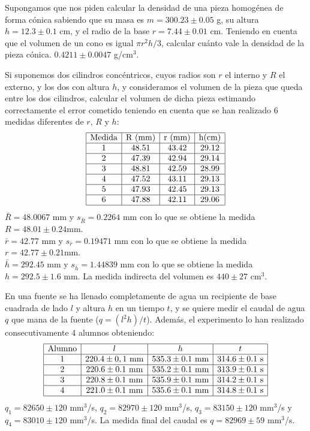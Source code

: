 {Supongamos que nos piden calcular la densidad de una pieza homogénea de forma cónica sabiendo que su masa es $m=
300.23\pm 0.05$ g, su altura $h=12.3 \pm 0.1$ cm, y el radio de la base $r=7.44 \pm 0.01$ cm. Teniendo en cuenta que el
volumen de un cono es igual $\pi r^2 h/3$, calcular cuánto vale la densidad de la pieza cónica.
}
{$0.4211\pm0.0047$ g/cm$^3$.
}
{}


{Si suponemos dos cilindros concéntricos, cuyos radios son $r$ el interno y $R$ el externo, y los dos con altura $h$, y
consideramos el volumen de la pieza que queda entre los dos cilindros, calcular el volumen de dicha pieza estimando
correctamente el error cometido teniendo en cuenta que se han realizado 6 medidas diferentes de $r$, $R$ y $h$:
\[
\begin{array}{|c|c|c|c|}
\hline
\mbox{Medida} & \mbox{R (mm)} & \mbox{r (mm)} & \mbox{h(cm)} \\
\hline
1 & 48.51 & 43.42 & 29.12 \\
\hline
2 & 47.39 & 42.94 & 29.14 \\
\hline
3 & 48.81 & 42.59 & 28.99 \\
\hline
4 & 47.52 & 43.11 & 29.13 \\
\hline
5 & 47.93 & 42.45 & 29.13 \\
\hline
6 & 47.88 & 42.11 & 29.06 \\
\hline
\end{array}
\]
}
{$\bar R=48.0067$ mm y $s_{\bar R}=0.2264$ mm con lo que se obtiene la medida $R=48.01\pm 0.24$mm.\\
$\bar r = 42.77$ mm y $s_{\bar r}=0.19471$ mm con lo que se obtiene la medida $r=42.77\pm 0.21$mm.\\
$\bar h= 292.45$ mm y $s_{\bar h}=1.44839$ mm con lo que se obtiene la medida $h=292.5\pm 1.6$ mm.
La medida indirecta del volumen es $440\pm 27$ cm$^3$. 
}
{}


{En una fuente se ha llenado completamente de agua un recipiente de base cuadrada de lado $l$ y altura $h$ en un tiempo
$t$, y se quiere medir el caudal de agua $q$ que mana de la fuente ($q=(l^2h)/t$). Además, el experimento lo han
realizado consecutivamente 4 alumnos obteniendo:
\[
\begin{array}{|c|c|c|c|}
\hline
\mbox{Alumno} & l & h & t \\
\hline
1 & 220.4 \pm 0,1 \mbox{ mm} & 535.3 \pm 0.1 \mbox{ mm} & 314.6 \pm 0.1 \mbox{ s} \\
\hline
2 & 220.6 \pm 0.1 \mbox{ mm} & 535.2 \pm 0.1 \mbox{ mm} & 313.9 \pm 0.1 \mbox{ s} \\
\hline
3 & 220.8 \pm 0.1 \mbox{ mm} & 535.9 \pm 0.1 \mbox{ mm} & 314.2 \pm 0.1 \mbox{ s} \\
\hline
4 & 221.0 \pm 0.1 \mbox{ mm} & 535.6 \pm 0.1 \mbox{ mm} & 314.8 \pm 0.1 \mbox{ s} \\
\hline
\end{array}
\]
}
{$q_1=82650\pm 120$ mm$^3$/s, $q_2=82970\pm 120$ mm$^3$/s, $q_3=83150\pm 120$ mm$^3$/s y $q_4=83010\pm 120$ mm$^3$/s.
La medida final del caudal es $q=82969\pm 59$ mm$^3$/s.
}
{}


